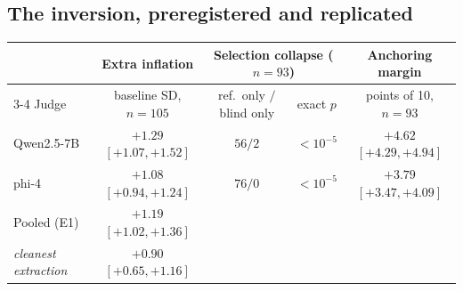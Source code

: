\documentclass[11pt]{article}
\begin{document}
\FloatBarrier
\subsection{The inversion, preregistered and replicated}
\label{sec:repl}

\begin{table}[tbp]
\centering
\small
\setlength{\tabcolsep}{3.5pt}
\begin{tabular}{lcccc}
\toprule
& Extra inflation & \multicolumn{2}{c}{Selection collapse ($n{=}93$)} & Anchoring margin \\
\cmidrule(lr){3-4}
Judge & baseline SD, $n{=}105$ & ref.\ only $/$ blind only & exact $p$ & points of 10, $n{=}93$ \\
\midrule
Qwen2.5-7B & $+1.29$ {\scriptsize$[+1.07, +1.52]$} & $56/2$ & $<10^{-5}$ & $+4.62$ {\scriptsize$[+4.29, +4.94]$} \\
phi-4      & $+1.08$ {\scriptsize$[+0.94, +1.24]$} & $76/0$ & $<10^{-5}$ & $+3.79$ {\scriptsize$[+3.47, +4.09]$} \\
Pooled (E1) & $\mathbf{+1.19}$ {\scriptsize$[+1.02, +1.36]$} & & & \\
\addlinespace[2pt]
\emph{\quad cleanest extraction} & $+0.90$ {\scriptsize$[+0.65, +1.16]$} & & & \\
\bottomrule
\end{tabular}


\end{table}
\end{document}
